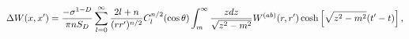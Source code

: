 \begin{equation}
\Delta W(x,x^{\prime })=\frac{-\sigma ^{1-D}}{\pi nS_{D}}\sum_{l=0}^{\infty }%
\frac{2l+n}{(rr^{\prime })^{n/2}}C_{l}^{n/2}(\cos \theta )\int_{m}^{\infty }%
\frac{zdz}{\sqrt{z^{2}-m^{2}}}W^{(ab)}(r,r^{\prime })\cosh \left[ \sqrt{%
z^{2}-m^{2}}(t^{\prime }-t)\right] ,  \label{intWeightrr}
\end{equation}

